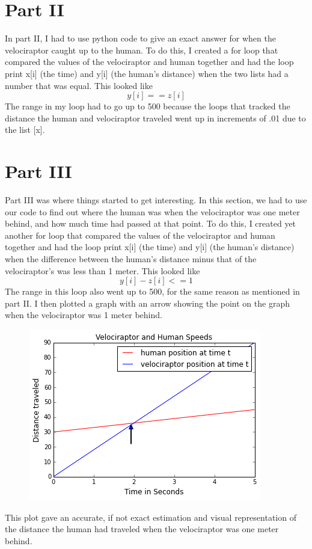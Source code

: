 \documentclass[twocolumn]{revtex4}
\begin{document}
	\section{Part II}
	In part II, I had to use python code to give an exact answer for when the velociraptor caught up to the human. To do this, I created a for loop that compared the values of the velociraptor and human together and had the loop print x[i] (the time) and y[i] (the human's distance) when the two lists had a number that was equal. This looked like $$ y[i]==z[i]$$ The range in my loop had to go up to 500 because the loops that tracked the distance the human and velociraptor traveled went up in increments of .01 due to the list [x]. 

\section{Part III}
Part III was where things started to get interesting. In this section, we had to use our code to find out where the human was when the velociraptor was one meter behind, and how much time had passed at that point. To do this, I created yet another for loop that compared the values of the velociraptor and human together and had the loop print x[i] (the time) and y[i] (the human's distance) when the difference between the human's distance minus that of the velociraptor's was less than 1 meter. This looked like $$y[i]-z[i]<=1$$ The range in this loop also went up to 500, for the same reason as mentioned in part II. I then plotted a graph with an arrow showing the point on the graph when the velociraptor was 1 meter behind. 
	\begin{figure}[h]
		\centering 
		\includegraphics[width=.4\textwidth]{2_plot}
	\end{figure}
	This plot gave an accurate, if not exact estimation and visual representation of the distance the human had traveled when the velociraptor was one meter behind. 
	
\end{document}
